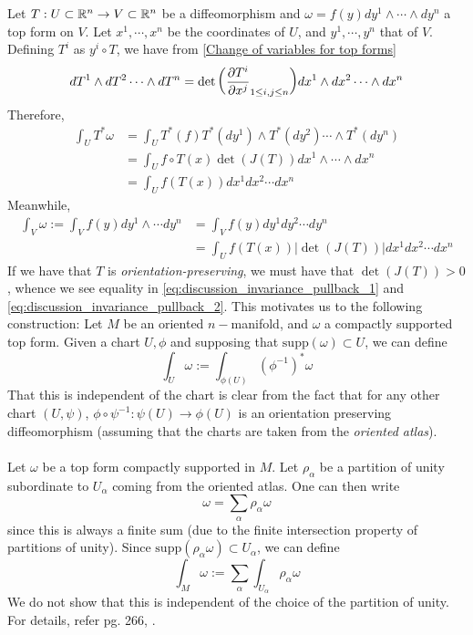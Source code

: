 Let $T:U\subset \mathbb{R}^n \to V\subset \mathbb{R}^n$ be a diffeomorphism and $\omega=f(y)dy^1\wedge \cdots \wedge dy^n$ a top form on $V$. Let $x^1,\cdots,x^n$ be the coordinates of $U$, and $y^1,\cdots, y^n$ that of $V$. Defining $T^i$ as $y^i\circ T$, we have from \ref{Change of variables for top forms} \begin{equation}
    dT^1\wedge dT^2 \cdots \wedge dT^n=\det \bigg{(}\frac{\partial T^i}{\partial x^j}_{1\leq i,j\leq n} \bigg{)} dx^1\wedge dx^2 \cdots \wedge dx^n
\end{equation}
Therefore, \begin{align}\label{eq:discussion_invariance_pullback_1}
    \int_U T^*\omega &=\int_U T^*(f) T^*(dy^1)\wedge T^*(dy^2)\cdots \wedge T^*(dy^n)
    \nonumber\\ &= \int_U f\circ T(x) \det (J(T)) dx^1\wedge \cdots \wedge dx^n
    \nonumber \\ &=\int_U f(T(x))dx^1 dx^2 \cdots dx^n
\end{align}
Meanwhile, \begin{align}\label{eq:discussion_invariance_pullback_2}
    \int_V \omega:=\int_V f(y)dy^1\wedge \cdots dy^n&=\int_V f(y) dy^1dy^2 \cdots dy^n
    \nonumber \\&=\int_U f(T(x))|\det(J(T))|dx^1dx^2\cdots dx^n
\end{align}
If we have that $T$ is \emph{orientation-preserving}, we must have that $\det(J(T))>0$, whence we see equality in \ref{eq:discussion_invariance_pullback_1} and \ref{eq:discussion_invariance_pullback_2}. This motivates us to the following construction:
Let $M$ be an oriented $n-$manifold, and $\omega$ a compactly supported top form. 
Given a chart $U,\phi$ and supposing that $\mathrm{supp}(\omega)\subset U$, we can define \begin{equation}
    \int_U \omega:=\int_{\phi(U)}(\phi^{-1})^* \omega 
\end{equation}
That this is independent of the chart is clear from the fact that for any other chart $(U,\psi)$, $\phi\circ \psi^{-1}:\psi(U)\to \phi(U)$ is an orientation preserving diffeomorphism (assuming that the charts are taken from the \emph{oriented atlas}). 
\\\\ Let $\omega$ be a top form compactly supported in $M$. Let $\rho_{\alpha}$ be a partition of unity subordinate to $U_{\alpha}$ coming from the oriented atlas. One can then write \begin{equation}
    \omega=\sum_{\alpha} \rho_{\alpha} \omega
\end{equation} since this is always a finite sum (due to the finite intersection property of partitions of unity).
Since $\mathrm{supp}(\rho_{\alpha} \omega)\subset U_{\alpha}$, we can define 
\begin{equation}\label{eq:defn:integral_of_n_forms}
    \int_M \omega:=\sum_{\alpha} \int_{U_{\alpha}}\rho_{\alpha}\omega 
\end{equation}
We do not show that this is independent of the choice of the partition of unity. For details, refer pg. 266, \cite{Tu2011}.


